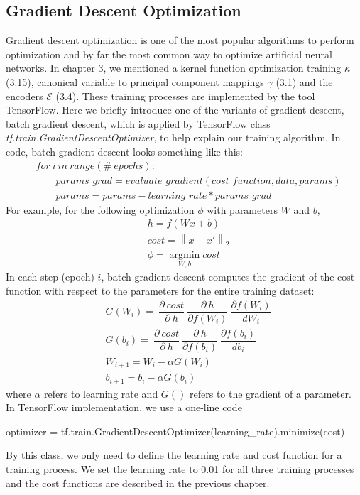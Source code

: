 \documentclass[12pt]{report} %
\newcommand{\norm}[1]{\left\lVert #1 \right\rVert}
\begin{document}
\subsection{Gradient Descent Optimization}
Gradient descent optimization\cite{GDO} is one of the most popular algorithms to perform optimization and by far the most common way to optimize artificial neural networks. In chapter 3, we mentioned a kernel function optimization training $\kappa$ (3.15), canonical variable to principal component mappings $\gamma$ (3.1) and the encoders $\mathcal{E}$ (3.4). These training processes are implemented by the tool TensorFlow. Here we briefly introduce one of the variants of gradient descent, batch gradient descent, which is applied by TensorFlow class \textit{tf.train.GradientDescentOptimizer}\cite{TFGDO}, to help explain our training algorithm. In code, batch gradient descent looks something like this:
\begin{equation}
\begin{split}
&for\ i\ in\ range ( \#\ epochs ): \\
&\qquad params\_grad = evaluate\_gradient ( cost\_function , data , params ) \\
&\qquad params = params - learning\_rate * params\_grad
\end{split}
\end{equation}
For example, for the following optimization $\phi$ with parameters $W$ and $b$,
\begin{equation}
\begin{split}
&h=f(Wx +b)\\
&cost=\norm{x-x'}_2\\
&\phi=\operatorname*{argmin}_{W,b}cost
\end{split}
\end{equation}
In each step (epoch) $i$, batch gradient descent computes the gradient of the cost function with respect to the parameters for the entire training dataset:
\begin{equation}
\begin{split}
&G({W_i})=\ \dfrac{\partial\ cost}{\partial\ h}\ \dfrac{\partial\ h}{\partial f(W_i)}\ \dfrac{\partial f(W_i)}{dW_i} \\
&G({b_i}) =\ \dfrac{\partial\ cost}{\partial\ h}\ \dfrac{\partial\ h}{\partial f(b_i)}\ \dfrac{\partial f(b_i)}{db_i} \\
&W_{i+1}=W_i - \alpha G(W_i) \\
&b_{i+1}=b_i - \alpha G(b_i)
\end{split}
\end{equation}
where $\alpha$ refers to learning rate and $G()$ refers to the gradient of a parameter. In TensorFlow implementation, we use a one-line code
\begin{center}
	optimizer = tf.train.GradientDescentOptimizer(learning\_rate).minimize(cost)
\end{center}
By this class, we only need to define the learning rate and cost function for a training process. We set the learning rate to 0.01 for all three training processes and the cost functions are described in the previous chapter.
\end{document}
